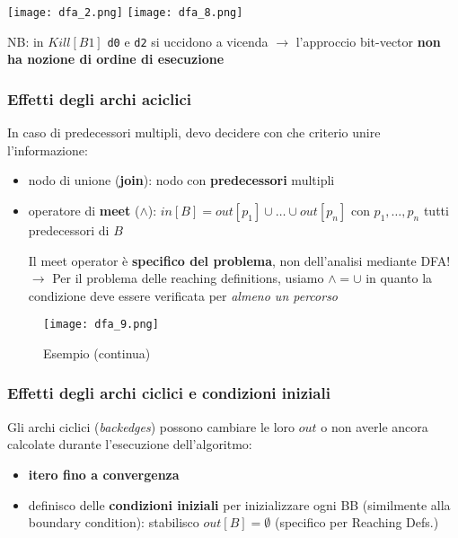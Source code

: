 \vspace{-1em}
\begin{example}
  \begin{center}
    \texttt{[image: dfa\_2.png]}\hfill
    \texttt{[image: dfa\_8.png]}
  \end{center}
  \begin{emphasize}
    NB: in $Kill[B1]$ \lstinline|d0| e \lstinline|d2| si uccidono a vicenda $\rightarrow$ l'approccio bit-vector \textbf{non ha nozione di ordine di esecuzione}
  \end{emphasize}
\end{example}

\vspace{-1em}
\subsubsection{Effetti degli archi aciclici}

In caso di predecessori multipli, devo decidere con che criterio unire l'informazione:
\begin{itemize}
  \item nodo di unione (\textbf{join}): nodo con \textbf{predecessori} multipli
  \item operatore di \textbf{meet} ($\wedge$): $in[B] = out[p_1] \cup \ldots \cup out[p_n]$ con $p_1,\ldots,p_n$ tutti predecessori di $B$
    \begin{emphasize}
      Il meet operator \`e \textbf{specifico del problema}, non dell'analisi mediante DFA!
      \noindent $\rightarrow$ Per il problema delle reaching definitions, usiamo $\wedge = \cup$ in quanto la condizione deve essere verificata per \textit{almeno un percorso}
    \end{emphasize}
\end{itemize}

\begin{figure}[h]
  \centering
  \texttt{[image: dfa\_9.png]}
  \caption{Esempio (continua)}
\end{figure}

\subsubsection{Effetti degli archi ciclici e condizioni iniziali}

Gli archi ciclici (\textit{backedges}) possono cambiare le loro $out$ o non averle ancora calcolate durante l'esecuzione dell'algoritmo:
\begin{itemize}
  \item \textbf{itero fino a convergenza}
  \item definisco delle \textbf{condizioni iniziali} per inizializzare ogni BB (similmente alla boundary condition): stabilisco $out[B] = \emptyset$ (specifico per Reaching Defs.)
\end{itemize}

